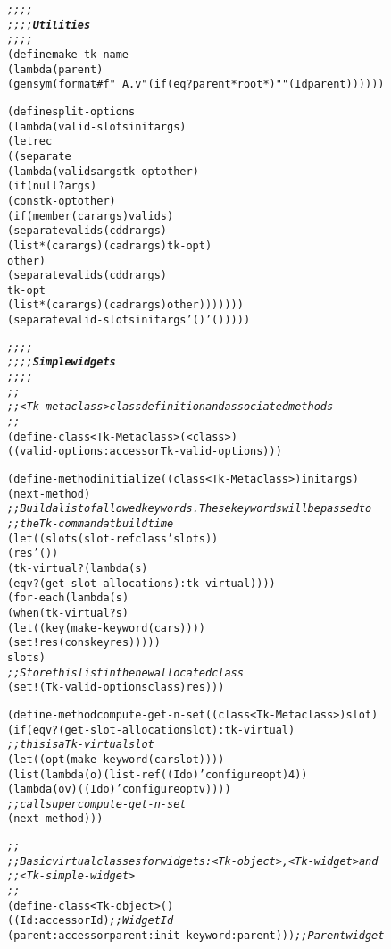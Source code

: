 \begin{alltt}
{\it ;;;;}
{\it ;;;; {\bf Utilities}}
{\it ;;;;}
(define make-tk-name 
  (lambda (parent)
    (gensym (format #f "~A.v" (if (eq? parent *root*) "" (Id parent))))))

(define split-options
  (lambda (valid-slots initargs)
    (letrec 
        ((separate 
          (lambda (valids args tk-opt other)
            (if (null? args)
                (cons tk-opt other)
                (if (member (car args) valids)
                    (separate valids (cddr args)
                              (list* (car args) (cadr args) tk-opt)
                              other)
                    (separate valids (cddr args)
                              tk-opt 
                              (list* (car args) (cadr args) other)))))))
      (separate valid-slots initargs '() '()))))

{\it ;;;;}
{\it ;;;; {\bf Simple widgets}}
{\it ;;;;}
{\it ;; }
{\it ;; {\tt{}<}Tk-metaclass{\tt{}>} class definition and associated methods}
{\it ;;}
(define-class {\tt{}<}Tk-Metaclass{\tt{}>} ({\tt{}<}class{\tt{}>})
  ((valid-options :accessor Tk-valid-options)))


(define-method initialize ((class {\tt{}<}Tk-Metaclass{\tt{}>}) initargs)
  (next-method)
  {\it ;; Build a list of allowed keywords. These keywords will be passed to}
  {\it ;; the Tk-command at build time}
  (let ((slots        (slot-ref class 'slots))
        (res         '())
        (tk-virtual?  (lambda(s) 
                        (eqv? (get-slot-allocation s) :tk-virtual))))
    (for-each (lambda (s)
                (when (tk-virtual? s)
                  (let ((key (make-keyword (car s))))
                    (set! res (cons key res)))))
              slots)
    {\it ;; Store this list in the new allocated class}
    (set! (Tk-valid-options class) res)))


(define-method compute-get-n-set ((class {\tt{}<}Tk-Metaclass{\tt{}>}) slot)
  (if (eqv? (get-slot-allocation slot) :tk-virtual)
      {\it ;; this is a Tk-virtual slot}
      (let ((opt (make-keyword (car slot))))
        (list (lambda (o)   (list-ref ((Id o) 'configure opt) 4))
              (lambda (o v) ((Id o) 'configure opt v))))
      {\it ;; call super compute-get-n-set}
      (next-method)))

{\it ;;}
{\it ;; Basic virtual classes for widgets: {\tt{}<}Tk-object{\tt{}>}, {\tt{}<}Tk-widget{\tt{}>} and }
{\it ;; {\tt{}<}Tk-simple-widget{\tt{}>}}
{\it ;;}
(define-class {\tt{}<}Tk-object{\tt{}>} ()
  ((Id      :accessor Id)                             {\it ;; Widget Id}
   (parent  :accessor parent :init-keyword :parent))) {\it ;; Parent widget}


\end{alltt}
